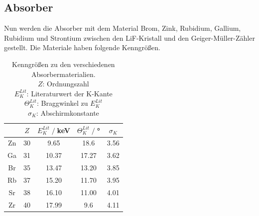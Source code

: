 \subsection{Absorber}
Nun werden die Absorber mit dem Material Brom, Zink, Rubidium, Gallium, Rubidium und Strontium
zwischen den LiF-Kristall und den Geiger-Müller-Zähler gestellt.
Die Materiale haben folgende Kenngrößen.
\begin{table}
    \centering
    \begin{tabular}{c | c c c c}
        \toprule
        &$Z$ & $E_K^{Lit}\;/\;$keV & $\Theta_K^{Lit}\;/\;$° & $\sigma_K$\\
        \midrule
        Zn & 30 & 9.65 & 18.6 & 3.56\\
        Ga & 31 & 10.37 & 17.27 &3.62\\
        Br & 35 & 13.47 & 13.20 &3.85\\
        Rb & 37 & 15.20 & 11.70 &3.95\\
        Sr & 38 & 16.10 & 11.00 &4.01\\
        Zr & 40 & 17.99 & 9.6 & 4.11\\
        \bottomrule
    \end{tabular}
    \caption{Kenngrößen zu den verschiedenen Absorbermaterialien.\cite{Absorptionskanten}\\
    $Z$: Ordnungszahl\\
    $E_K^{Lit}$: Literaturwert der K-Kante\cite{Absorptionskanten}\\
    $\Theta_K^{Lit}$: Braggwinkel zu $E_K^{Lit}$\\
    $\sigma_K$: Abschirmkonstante}
    \label{tab:kenngroesse}
\end{table}

